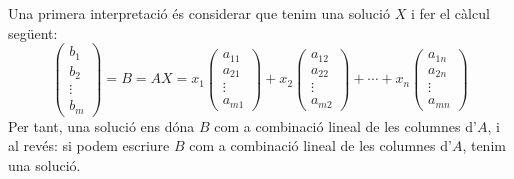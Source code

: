 \documentclass[a4paper,12pt,twoside]{article}
\newcommand{\1}{\mathbf{1}}
\newcommand{\0}{\mathbf{0}}
\theoremstyle{definition}
\theoremstyle{remark}
\begin{document}
Una primera interpretació és considerar que tenim una solució $X$ i fer el càlcul següent:
$$
\begin{pmatrix}
b_1 \\ b_2 \\ \vdots \\ b_m
\end{pmatrix} = B = AX =
x_1 \begin{pmatrix}
a_{11} \\ a_{21} \\ \vdots \\ a_{m1}
\end{pmatrix} +
x_2 \begin{pmatrix}
a_{12} \\ a_{22} \\ \vdots \\ a_{m2}
\end{pmatrix} + \cdots +
x_n \begin{pmatrix}
a_{1n} \\ a_{2n} \\ \vdots \\ a_{mn}
\end{pmatrix}
$$
Per tant, una solució ens dóna $B$ com a combinació lineal de les columnes d'$A$, i al revés: si podem escriure $B$ com a combinació lineal de les columnes d'$A$, tenim una solució.
\end{document}
